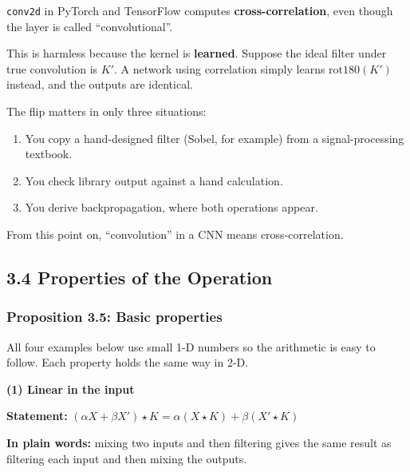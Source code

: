 \texttt{conv2d} in PyTorch and TensorFlow computes \textbf{cross-correlation}, even though the layer is called ``convolutional''.

This is harmless because the kernel is \textbf{learned}. Suppose the ideal filter under true convolution is $K'$. A network using correlation simply learns $\mathrm{rot180}(K')$ instead, and the outputs are identical.

The flip matters in only three situations:
\begin{enumerate}
  \item You copy a hand-designed filter (Sobel, for example) from a signal-processing textbook.
  \item You check library output against a hand calculation.
  \item You derive backpropagation, where both operations appear.
\end{enumerate}
From this point on, ``convolution'' in a CNN means cross-correlation.


\subsection*{3.4 Properties of the Operation}

\subsubsection*{Proposition 3.5: Basic properties}
All four examples below use small 1-D numbers so the arithmetic is easy to follow. Each property holds the same way in 2-D.

\textbf{(1) Linear in the input}

\textbf{Statement:} $(\alpha X + \beta X') \star K = \alpha (X \star K) + \beta (X' \star K)$

\textbf{In plain words:} mixing two inputs and then filtering gives the same result as filtering each input and then mixing the outputs.

